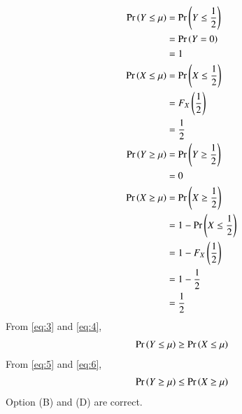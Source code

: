 \documentclass[journal,12pt,twocolumn]{IEEEtran}
\theoremstyle{remark}
\begin{document}
\begin{align}
\Pr\left(Y \leq \mu\right)&=\Pr\left(Y \leq \frac{1}{2}\right)\\
&=\Pr\left(Y=0\right)\\
&=1
\label{eq:3}\\
\Pr\left(X \leq \mu\right)&=\Pr\left(X \leq \frac{1}{2}\right)\\
&=F_X\left(\frac{1}{2}\right)\\
&=\frac{1}{2}
\label{eq:4}\\
\Pr\left(Y \geq \mu\right)&=\Pr\left(Y \geq \frac{1}{2}\right)\\
&=0
\label{eq:5}\\
\Pr\left(X \geq \mu\right)&=\Pr\left(X \geq \frac{1}{2}\right)\\
&=1-\Pr\left(X \leq \frac{1}{2}\right)\\
&=1-F_X\left(\frac{1}{2}\right)\\
&=1-\frac{1}{2}\\
&=\frac{1}{2}
\label{eq:6}
\end{align}
From \eqref{eq:3} and \eqref{eq:4},
\begin{align}
\Pr\left(Y \leq \mu\right) \geq \Pr\left(X \leq \mu\right)
\end{align}
From \eqref{eq:5} and \eqref{eq:6},
\begin{align}
\Pr\left(Y \geq \mu\right) \leq \Pr\left(X \geq \mu\right)
\end{align}
Option (B) and (D) are correct. 
\end{document}
